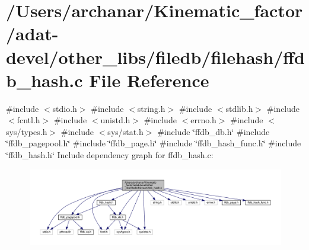 \hypertarget{adat-devel_2other__libs_2filedb_2filehash_2ffdb__hash_8c}{}\section{/\+Users/archanar/\+Kinematic\+\_\+factor/adat-\/devel/other\+\_\+libs/filedb/filehash/ffdb\+\_\+hash.c File Reference}
\label{adat-devel_2other__libs_2filedb_2filehash_2ffdb__hash_8c}
{\ttfamily \#include $<$stdio.\+h$>$}\newline
{\ttfamily \#include $<$string.\+h$>$}\newline
{\ttfamily \#include $<$stdlib.\+h$>$}\newline
{\ttfamily \#include $<$fcntl.\+h$>$}\newline
{\ttfamily \#include $<$unistd.\+h$>$}\newline
{\ttfamily \#include $<$errno.\+h$>$}\newline
{\ttfamily \#include $<$sys/types.\+h$>$}\newline
{\ttfamily \#include $<$sys/stat.\+h$>$}\newline
{\ttfamily \#include \char`\"{}ffdb\+\_\+db.\+h\char`\"{}}\newline
{\ttfamily \#include \char`\"{}ffdb\+\_\+pagepool.\+h\char`\"{}}\newline
{\ttfamily \#include \char`\"{}ffdb\+\_\+page.\+h\char`\"{}}\newline
{\ttfamily \#include \char`\"{}ffdb\+\_\+hash\+\_\+func.\+h\char`\"{}}\newline
{\ttfamily \#include \char`\"{}ffdb\+\_\+hash.\+h\char`\"{}}\newline
Include dependency graph for ffdb\+\_\+hash.\+c\+:
\nopagebreak
\begin{figure}[H]
\begin{center}
\leavevmode
\includegraphics[width=350pt]{de/d93/adat-devel_2other__libs_2filedb_2filehash_2ffdb__hash_8c__incl}
\end{center}
\end{figure}
